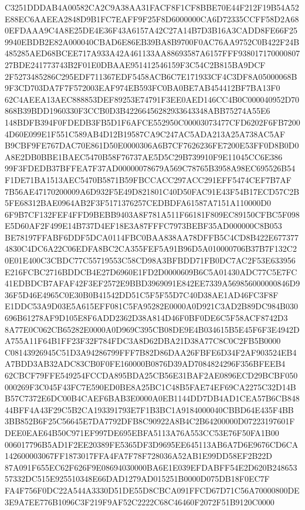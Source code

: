\documentclass[UTF8,fontset=fandol,zihao=-4,a4paper]{ctexart}
\begin{document}
{{C3251DDDAB4A00582CA2C9A38AA31FACF8F1CF8BBE70E44F212F19B54A52E88EC6AAEEA2848D9B1FC7EAFF9F25F8D6000000CA6D72335CCFF58D2A68
0EFDAAA9C4A8E25DE4E36F43A6157A42C27A14B7D3B16A3CADD8FE66F259940EBDB2E82A000040CBAD6E86EB39BA8B9700F0AC76AA9752C0B422F24B
485285AED68BCEE717A933A42A461133AA88693587A6157FFF93801717000080727BDE241773743B2F01E0DBAAE951412546159F3C54C2B815BA9DCF
2F5273485286C295EDF711367EDF5458ACB6C7E171933CF4C3DF8A05000068B9F3CD703DA7F7F572003EAF974EB593FC0BA0BE7AB454412BF7BA13F0
62C4AEEA13AEC888853DEF89253E74791F3EE0AED146CC4B0C000040952D70868B39BDD1960330F3CCB0D3B42266456282933643348ABB75274A55E6
148BDFB394F0FDEDB3FB5D1F6AFCE552950C00003073477CFD6202F6FB72004D60E099E1F551C589AB4D12B19587CA9C247AC5ADA213A25A738AC5AF
B9CBF9FE767DAC70E861D50E0000306A6B7CF7626236FE7200E53FF0D8B0D0A8E2DB0BBE1BAEC5470B58F76737AE5D5C29B739910F9E11045CC6E386
99F3FDEDB37BFFEA7F37AD00000078679A569C78765B3958A98EC695526B54F1DE71BA1513AEC5470B5871B59FBCCACC297ACC291EFF5474CEF7B7AF
7B56AE47170200009A6D932F5E49D821801C40D50FAC91E43F54B17ECD57C2B5FE68312BAE0964AB2F3F5171376257CEDBDFA61587A7151A110000D0
6F9B7CF132FEF4FFD9BEBB9403A8F781A511F66181F809EC89150CFBC5F098E5D60AF2F499E14B737D4EF18E3A87FFFC7973BEBF35AD000000C8B053
BE78197FFABF6DDF5DCA0114FBC0BAA838AA78DFFB5C4CD8B422E6773774830C4DC6A22C06EDFA8BC2CA355FEF5A91B96D5A010000706B37B7F132C2
0E01E400C3CBDC77C55719553C58CD98A3BFBDD71FB0DC7AC2F53E633956E216FCBC2716BDDCB4E27D6960E1FD2D0000609B6C5A01430ADC77C5E7FC
41EDBDCB7AFAF42F3EF2572E9BBD3969091E842EE7339A569856000000846D936F5D46E4965C0E30B0B41542DD51C5F5F55D7C40D38AE1AD46FC3F8F
E1DDC53A9D03E5A615EFF081C5FA95282E0000A0D921C3AD2B89DC984B030696B61278AF9D105E8F6ADD2362D38A814D46F0BF0DE6C5F58ACF8742D3
8A77E0C062CB65282E0000A0D969C395CB08DE9E4B034615B5E45F6F3E4942DA755A11F64B1FF23F32F784FDC3A8D62DBA21D38A77C8C0C2FB5B0000
C08143926945C51D3A94286799FFF7B82D86DAA26FBFE6D34F2AF903524EB4A7BDD3AB32ADC83CB0F0FE160000B0876D39AD7084824296F356BFEEB4
62CBCF79FFE549254FCCDA895BDA25CB56E31BAF2AE0896ECD29BCBF050000269F3C045F43FC7E590ED0BE8A25BC1C48B5FAE74EF69CA2275C32D14B
B57C7372E6DC00B4CAEF6BAB3E0000A0EB1144DD7DB4AD1CEA57B6CB84844BFF4A43F29C5B2CA193391793E7F1B3BC1A9184000040CBBD64E435F4BB
3BB852B6F25C56645E7DA7792DFB8C90922A8B4C2B64200000D07223197601FDEE0EAE64B50C971EF997DE695EBFA5113A76A553CC53E76F50FA1B00
006017796B5AD1F2EE20389FE5365DF3D9695EE645113AB6A7D6E9676CD6CA142600003067FF1873017FFA4FA7F78F728036A52AB1E99DD58EF2B22D
87A091F655EC62F626F9E08694030000BA6E1E039EFDABFF54E2D620B24865357332DC515E925510348E66DAD1279AD015251B0000D075DB18F0EC7F
FA4F756F0DC22A544A3330D51DE55D8CBCA091FFCD67D71C56A70000800DE3E9A7EE776B1096C3F219F9AF52C2222C68C46460F2072F51B9120C0000
}}
\end{document}
